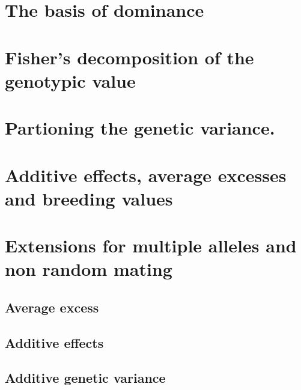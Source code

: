 \documentclass[
]{book}
\begin{document}
\hypertarget{the-basis-of-dominance}{%
\section{The basis of dominance}\label{the-basis-of-dominance}}

\hypertarget{fishers-decomposition-of-the-genotypic-value}{%
\section{Fisher's decomposition of the genotypic value}\label{fishers-decomposition-of-the-genotypic-value}}

\hypertarget{partioning-the-genetic-variance.}{%
\section{Partioning the genetic variance.}\label{partioning-the-genetic-variance.}}

\hypertarget{additive-effects-average-excesses-and-breeding-values}{%
\section{Additive effects, average excesses and breeding values}\label{additive-effects-average-excesses-and-breeding-values}}

\hypertarget{extensions-for-multiple-alleles-and-non-random-mating}{%
\section{Extensions for multiple alleles and non random mating}\label{extensions-for-multiple-alleles-and-non-random-mating}}

\hypertarget{average-excess}{%
\subsection{Average excess}\label{average-excess}}

\hypertarget{additive-effects}{%
\subsection{Additive effects}\label{additive-effects}}

\hypertarget{additive-genetic-variance}{%
\subsection{Additive genetic variance}\label{additive-genetic-variance}}
\end{document}

